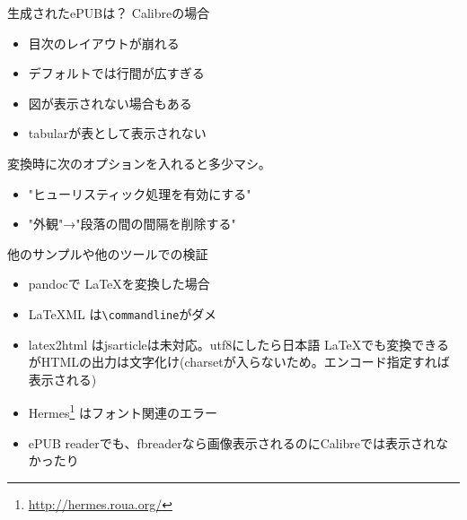\begin{frame}{生成されたePUBは？}
  Calibreの場合
\begin{itemize}
  \item 目次のレイアウトが崩れる
  \item デフォルトでは行間が広すぎる
  \item 図が表示されない場合もある
  \item tabularが表として表示されない
\end{itemize}
変換時に次のオプションを入れると多少マシ。
\begin{itemize}
  \item "ヒューリスティック処理を有効にする"
  \item "外観"→"段落の間の間隔を削除する"
\end{itemize}
\end{frame}

\begin{frame}{他のサンプルや他のツールでの検証}

{\scriptsize
  \begin{itemize}
  \item pandocで \LaTeX を変換した場合
  \item \LaTeX ML は\texttt{\textbackslash commandline}がダメ
  \item latex2html はjsarticleは未対応。utf8にしたら日本語 \LaTeX でも変換できるがHTMLの出力は文字化け(charsetが入らないため。エンコード指定すれば表示される)
  \item Hermes\footnote{\url{http://hermes.roua.org/}} はフォント関連のエラー
  \item ePUB readerでも、fbreaderなら画像表示されるのにCalibreでは表示されなかったり
\end{itemize}
}
\end{frame}

